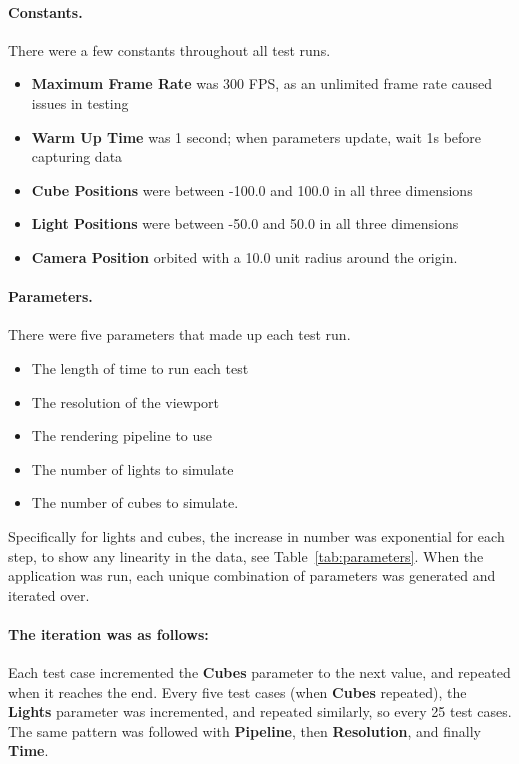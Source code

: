 \documentclass[11pt]{article}
\begin{document}
\paragraph{Constants.} There were a few constants throughout all test runs.
\begin{itemize}
  \item \textbf{Maximum Frame Rate} was 300 FPS, as an unlimited frame rate caused issues in testing
  \item \textbf{Warm Up Time} was 1 second; when parameters update, wait 1s before capturing data
  \item \textbf{Cube Positions} were between -100.0 and 100.0 in all three dimensions
  \item \textbf{Light Positions} were between -50.0 and 50.0 in all three dimensions
  \item \textbf{Camera Position} orbited with a 10.0 unit radius around the origin.
\end{itemize}

\paragraph{Parameters.} There were five parameters that made up each test run.
\begin{itemize}
  \item The length of time to run each test
  \item The resolution of the viewport
  \item The rendering pipeline to use
  \item The number of lights to simulate
  \item The number of cubes to simulate.
\end{itemize}

Specifically for lights and cubes, the increase in number was exponential for each step, to show any linearity in the data, see Table~\ref{tab:parameters}.
When the application was run, each unique combination of parameters was generated and iterated over.

\paragraph{The iteration was as follows:}
Each test case incremented the \textbf{Cubes} parameter to the next value, and repeated when it reaches the end.
Every five test cases (when \textbf{Cubes} repeated), the \textbf{Lights} parameter was incremented, and repeated similarly, so every 25 test cases.
The same pattern was followed with \textbf{Pipeline}, then \textbf{Resolution}, and finally \textbf{Time}.
\end{document}
